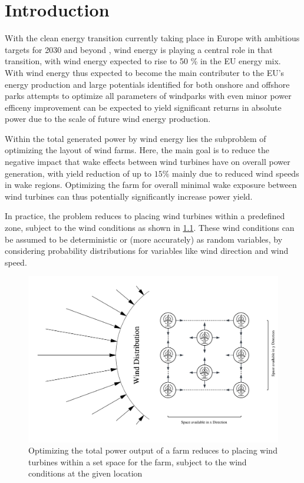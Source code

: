 
\chapter{Introduction}\label{chapter:introduction}


With the clean energy transition currently taking place in Europe with ambitious targets for 2030 and beyond \cite{EU_RE_Targets_2023}, wind energy is playing a central role in that transition, with wind energy expected to rise to 50 \% in the EU energy mix. \cite{ConsiliumEU_Harnessing_Wind_Power_2024}
With wind energy thus expected to become the main contributer to the EU's energy production and large potentials identified for both onshore and offshore parks \cite{EEA_Wind_Energy_Potential_2009} attempts to optimize all parameters of windparks with even minor power efficeny improvement can be expected to yield significant returns in absolute power due to the scale of future wind energy production. 

Within the total generated power by wind energy lies the subproblem of optimizing the layout of wind farms. Here, the main goal is to reduce the negative impact that wake effects between wind turbines have on overall power generation, with yield reduction of up to $15\%$  mainly due to reduced wind speeds in wake regions. Optimizing the farm for overall minimal wake exposure between wind turbines can thus potentially significantly increase power yield. \cite{hou_review_2019} \cite{KIM2024123383} 

In practice, the problem reduces to placing wind turbines within a predefined zone, subject to the wind conditions as shown in \ref{fig:intro_plot}. These wind conditions can be assumed to be deterministic or (more accurately) as random variables, by considering probability distributions for variables like wind direction and wind speed.


\begin{figure}[h] 
	\centering
	\includegraphics[width=1\textwidth]{figures/introduction/intro_plot.png} 
	\caption{Optimizing the total power output of a farm reduces to placing wind turbines within a set space for the farm, subject to the wind conditions at the given location}
	\label{fig:intro_plot}
\end{figure}

